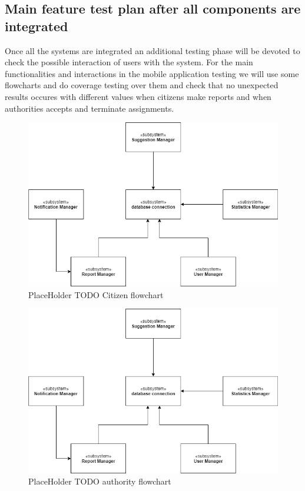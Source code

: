 \subsection{Main feature test plan after all components are integrated}
Once all the systems are integrated an additional testing phase will be devoted to check the possible interaction of users with the system. For the main functionalities and interactions in the mobile application testing we will use some flowcharts and do coverage testing over them and check that no unexpected results occures with different values when citizens make reports and when authorities accepts and terminate assignments.
\begin{figure}[H]
\centering
\includegraphics[width=\textwidth]{Images/TestServlet.png}
\caption{\label{fig:ComWI}PlaceHolder TODO Citizen flowchart}
\end{figure}
\begin{figure}[H]
\centering
\includegraphics[width=\textwidth]{Images/TestServlet.png}
\caption{\label{fig:ComWI}PlaceHolder TODO authority flowchart}
\end{figure}


